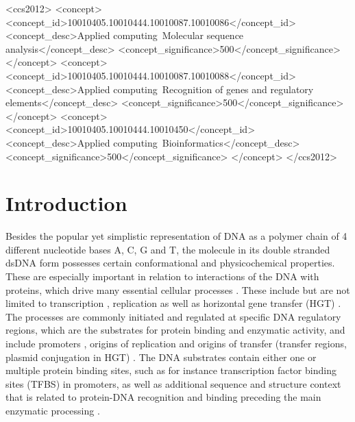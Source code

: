 \documentclass[sigconf]{acmart}
\begin{document}
\begin{CCSXML}
<ccs2012>
<concept>
<concept_id>10010405.10010444.10010087.10010086</concept_id>
<concept_desc>Applied computing~Molecular sequence analysis</concept_desc>
<concept_significance>500</concept_significance>
</concept>
<concept>
<concept_id>10010405.10010444.10010087.10010088</concept_id>
<concept_desc>Applied computing~Recognition of genes and regulatory elements</concept_desc>
<concept_significance>500</concept_significance>
</concept>
<concept>
<concept_id>10010405.10010444.10010450</concept_id>
<concept_desc>Applied computing~Bioinformatics</concept_desc>
<concept_significance>500</concept_significance>
</concept>
</ccs2012>
\end{CCSXML}



\maketitle


\section{Introduction}
Besides the popular yet simplistic representation of DNA as a polymer chain of 4 different nucleotide bases A, C, G and T, the molecule in its double stranded dsDNA form possesses certain conformational and physicochemical properties. These are especially important in relation to interactions of the DNA with proteins, which drive many essential cellular processes \cite{Rohs2009-hm,Zrimec2015-xf,Zrimec2018-lx}. These include but are not limited to transcription \cite{Rohs2009-hm}, replication \cite{Chen2012-gd} as well as horizontal gene transfer (HGT) \cite{Zrimec2018-lx,Zrimec2020-wx}. The processes are commonly initiated and regulated at specific DNA regulatory regions, which are the substrates for protein binding and enzymatic activity, and include promoters \cite{Watson2008-dt}, origins of replication \cite{Chen2012-gd} and origins of transfer (transfer regions, plasmid conjugation in HGT) \cite{De_La_Cruz2010-xj}. The DNA substrates contain either one or multiple protein binding sites, such as for instance transcription factor binding sites (TFBS) in promoters, as well as additional sequence and structure context that is related to protein-DNA recognition and binding preceding the main enzymatic processing \cite{Levo2015-iu,Marcovitz2013-kg,Zrimec2018-lx}.
\end{document}

